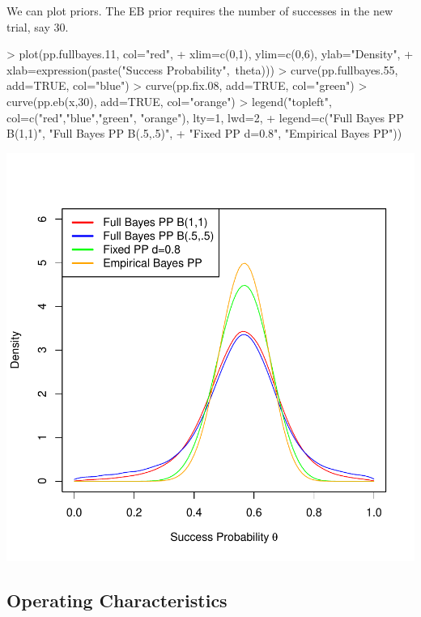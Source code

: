 \documentclass{article}
\begin{document}
We can plot priors. The EB prior requires the number of successes in the new trial, say 30.
\begin{Schunk}
\begin{Sinput}
> plot(pp.fullbayes.11, col="red",
+      xlim=c(0,1), ylim=c(0,6), ylab="Density", 
+      xlab=expression(paste("Success Probability",~theta)))
> curve(pp.fullbayes.55, add=TRUE, col="blue")
> curve(pp.fix.08, add=TRUE, col="green")
> curve(pp.eb(x,30), add=TRUE, col="orange")
> legend("topleft", col=c("red","blue","green", "orange"), lty=1, lwd=2,
+        legend=c("Full Bayes PP B(1,1)", "Full Bayes PP B(.5,.5)",
+                 "Fixed PP d=0.8", "Empirical Bayes PP"))
\end{Sinput}
\end{Schunk}
\includegraphics{Binomial-plot}
\subsection{Operating Characteristics}
\end{document}
